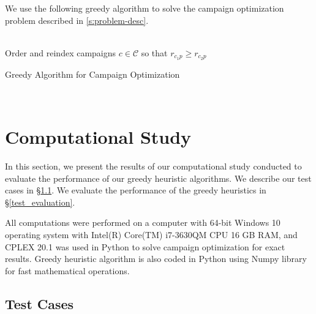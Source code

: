\documentclass[11pt]{article}
\begin{document}
We use the following greedy algorithm to solve the campaign optimization problem described in \ref{s:problem-desc}.

\begin{algorithm}[H]
\\
Order and reindex campaigns $c\in\mathcal{C}$ so that $r_{c_{1}p} \geq r_{c_{2}p}$
\\
\;
\caption{Greedy Algorithm for Campaign Optimization}
\label{algo:change}
\end{algorithm}\\

\section{Computational Study} \label{num-analysis}

In this section, we present the results of our computational study conducted to evaluate the performance of our greedy heuristic algorithms. We describe our test cases in \S \ref{test_cases}. We evaluate the performance of the greedy heuristics in \S \ref{test_evaluation}.

All computations were performed on a computer with 64-bit Windows 10 operating system with Intel(R) Core(TM) i7-3630QM CPU 16 GB RAM, and CPLEX 20.1 was used in Python to solve campaign optimization for exact results. Greedy heuristic algorithm is also coded in Python using Numpy library for fast mathematical operations.

\subsection{Test Cases} \label{test_cases}
\end{document}
